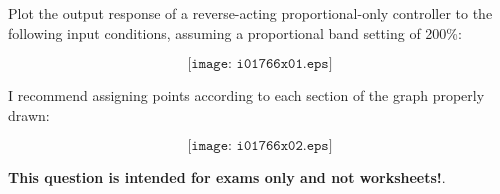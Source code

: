 

Plot the output response of a reverse-acting proportional-only controller to the following input conditions, assuming a proportional band setting of 200\%:

$$\texttt{[image: i01766x01.eps]}$$







I recommend assigning points according to each section of the graph properly drawn:

$$\texttt{[image: i01766x02.eps]}$$







{\bf This question is intended for exams only and not worksheets!}.



